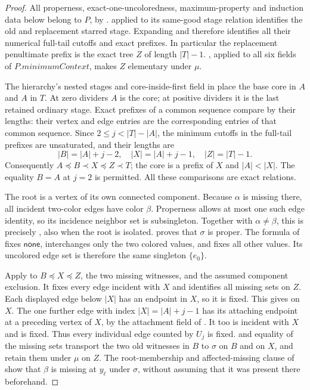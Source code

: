 \begin{proof}
All properness, exact-one-uncoloredness, maximum-property and induction
data below belong to \(P\), by .
 applied to its same-good stage
relation identifies the old and replacement starred stage. Expanding
 and 
therefore identifies all their numerical full-tail cutoffs and exact
prefixes. In particular the replacement penultimate prefix is the exact
tree \(Z\) of length \(|T|-1\).
, applied to all
six fields of \(P.\mathit{minimumContext}\), makes \(Z\) elementary
under \(\mu\).

The hierarchy's nested stages and core-inside-first field in
 place the base core in \(A\) and
\(A\) in \(T\). At zero dividers \(A\) is the core; at positive
dividers it is the last retained ordinary stage. Exact prefixes of a
common sequence compare by their lengths: their vertex and edge entries
are the corresponding entries of that common sequence. Since
\(2\le j<|T|-|A|\), the minimum cutoffs in the full-tail prefixes
are unsaturated, and their lengths are
\[
 |B|=|A|+j-2,\quad |X|=|A|+j-1,\quad |Z|=|T|-1.
\]
Consequently \(A\preccurlyeq B\prec X\preccurlyeq Z\prec T\);
the core is a prefix of \(X\) and \(|A|<|X|\).
The equality \(B=A\) at \(j=2\) is permitted. All these comparisons
are exact  relations.

The root is a vertex of its own connected component. Because \(\alpha\)
is missing there, all incident two-color edges have color \(\beta\).
Properness allows at most one such edge identity, so its incidence
neighbor set is subsingleton. Together with \(\alpha\ne\beta\),
this is precisely , also when the root
is isolated.  proves that
\(\sigma\) is proper. The formula of 
fixes \(\mathsf{none}\), interchanges only the two colored values,
and fixes all other values. Its uncolored edge set is therefore the same
singleton \(\{e_0\}\).

Apply  to \(B\preccurlyeq
X\preccurlyeq Z\), the two missing witnesses, and the assumed
component exclusion. It fixes every edge incident with \(X\) and
identifies all missing sets on \(Z\). Each displayed edge below
\(|X|\) has an endpoint in \(X\), so it is fixed.
This gives  on \(X\).
The one further edge with index \(|X|=|A|+j-1\) has its attaching
endpoint at a preceding vertex of \(X\), by the attachment field of
. It too is incident with \(X\) and is fixed.
Thus every individual edge counted by \(U_j\) is fixed.
 and equality of the
missing sets transport the two old witnesses in \(B\) to \(\sigma\)
on \(B\) and on \(X\), and retain them under \(\mu\) on \(Z\).
The root-membership and affected-missing clause of
 show that \(\beta\)
is missing at \(y_\ell\) under \(\sigma\), without assuming that it
was present there beforehand.


\end{proof}
